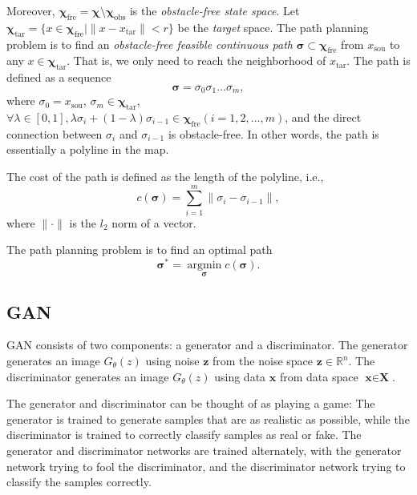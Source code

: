 \documentclass[smallcondensed]{svjour3}     %
\begin{document}
Moreover, $\bm{\chi}_{\textrm{fre}} = \bm{\chi} \setminus \bm{\chi}_{\textrm{obs}}$ is the \emph{obstacle-free state space}.
Let $\bm{\chi}_{\textrm{tar}} = \{x \in \bm{\chi}_{\textrm{fre}} \vert \lVert x - x_{\textrm{tar}} \rVert < r\}$ be the \emph{target} space.
The path planning problem is to find an \emph{obstacle-free feasible continuous path} $\bm{\sigma} \subset \bm{\chi}_{\textrm{fre}}$ from $x_{\textrm{sou}}$ to any $x \in \bm{\chi}_{\textrm{tar}}$.
That is, we only need to reach the neighborhood of $x_{\textrm{tar}}$.
The path is defined as a sequence
\begin{equation}\label{equation: path}
	\bm{\sigma} = \sigma_0 \sigma_1 \dots \sigma_m,
\end{equation}
where $\sigma_0 = x_{\textrm{sou}}$, $\sigma_m \in \bm{\chi}_{\textrm{tar}}$,
$\forall \lambda \in [0, 1], \lambda \sigma_i + (1 - \lambda)\sigma_{i - 1} \in \bm{\chi}_{\textrm{fre}} (i = 1, 2, \dots, m)$, and
	the direct connection between $\sigma_i$ and $\sigma_{i - 1}$ is obstacle-free.
In other words, the path is essentially a polyline in the map.

The cost of the path is defined as the length of the polyline, i.e.,
\begin{equation}\label{equation: path-cost}
	c(\bm{\sigma}) = \sum_{i=1}^{m} \lVert \sigma_i - \sigma_{i - 1} \rVert,
\end{equation}
where $\lVert \cdot \rVert$ is the $l_2$ norm of a vector.

The path planning problem is to find an optimal path
\begin{equation}\label{equation: optimal-path}
	\bm{\sigma}^* = \mathop{\arg\min} \limits_{\bm{\sigma}} c(\bm{\sigma}).
\end{equation}

\subsection{GAN}
GAN consists of two components: a generator and a discriminator.
The generator generates an image $G_\theta (z)$ using noise $\textbf{z}$ from the noise space $\textbf{z} \in \mathbb{R}^n $.
The discriminator generates an image $G_\theta (z)$ using data $\textbf{x}$ from data space $\textbf{x} \in \textbf{X}$.

The generator and discriminator can be thought of as playing a game:
The generator is trained to generate samples that are as realistic as possible, while the discriminator is trained to correctly classify samples as real or fake.
The generator and discriminator networks are trained alternately, with the generator network trying to fool the discriminator, and the discriminator network trying to classify the samples correctly.
\end{document}

